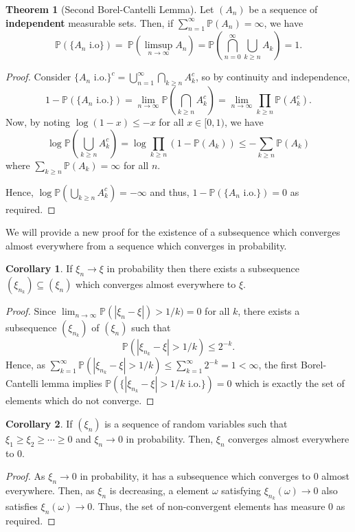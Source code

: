 \documentclass[]{article}
\theoremstyle{definition}
\newtheorem{theorem}{Theorem}
\newtheorem{corollary}{Corollary}[theorem]
\theoremstyle{definition}
\begin{document}
\begin{theorem}[Second Borel-Cantelli Lemma]
  Let \((A_n)\) be a sequence of \textbf{independent} measurable sets. Then, if 
  \(\sum_{n = 1}^\infty \mathbb{P}(A_n) = \infty\), we have 
  \[\mathbb{P}(\{A_n \text{ i.o}\}) = \
    \mathbb{P}\left(\limsup_{n \to \infty} A_n\right)
    = \mathbb{P}\left(\bigcap_{n = 0}^\infty \bigcup_{k \ge n} A_k\right) = 1.\]
\end{theorem}
\begin{proof}
  Consider \(\{A_n \text{ i.o.}\}^c = \bigcup_{n = 1}^\infty \bigcap_{k \ge n} A_k^c\),
  so by continuity and independence,
  \[1 - \mathbb{P}(\{A_n \text{ i.o.}\}) = 
    \lim_{n \to \infty}\mathbb{P}\left(\bigcap_{k \ge n}A_k^c\right)
    = \lim_{n \to \infty} \prod_{k \ge n} \mathbb{P}(A_k^c).\]
  Now, by noting \(\log(1 - x) \le -x\) for all \(x \in [0, 1)\), we have
  \[\log \mathbb{P}\left(\bigcup_{k \ge n} A_k^c\right) = 
    \log \prod_{k \ge n} (1 - \mathbb{P}(A_k))
    \le -\sum_{k \ge n} \mathbb{P}(A_k)\]
  where \(\sum_{k \ge n} \mathbb{P}(A_k) = \infty\) for all \(n\). 
  
  Hence, 
  \(\log \mathbb{P}\left(\bigcup_{k \ge n} A_k^c\right) = - \infty\) and thus, 
  \(1 - \mathbb{P}(\{A_n \text{ i.o.}\}) = 0\) as required.
\end{proof}

We will provide a new proof for the existence of a subsequence which converges 
almost everywhere from a sequence which converges in probability.

\begin{corollary}
  If \(\xi_n \to \xi\) in probability then there exists a subsequence 
  \((\xi_{n_k}) \subseteq (\xi_n)\) which converges almost everywhere to \(\xi\).
\end{corollary}
\begin{proof}
  Since \(\lim_{n \to \infty} \mathbb{P}(|\xi_n - \xi|) > 1 / k) = 0\) for all 
  \(k\), there exists a subsequence \((\xi_{n_k})\) of \((\xi_n)\) such that 
  \[\mathbb{P}(|\xi_{n_k} - \xi| > 1 / k) \le 2^{-k}.\]
  Hence, as \(\sum_{k = 1}^\infty \mathbb{P}(|\xi_{n_k} - \xi| > 1 / k) \le 
  \sum_{k = 1}^\infty 2^{-k} = 1 < \infty\), the first Borel-Cantelli lemma 
  implies \(\mathbb{P}(\{|\xi_{n_k} - \xi| > 1 / k \text{ i.o.}\}) = 0\)
  which is exactly the set of elements which do not converge.
\end{proof}

\begin{corollary}
  If \((\xi_n)\) is a sequence of random variables such that 
  \(\xi_1 \ge \xi_2 \ge \cdots \ge 0\) and \(\xi_n \to 0\) in probability. 
  Then, \(\xi_n\) converges almost everywhere to 0.
\end{corollary}
\begin{proof}
  As \(\xi_n \to 0\) in probability, it has a subsequence which converges to 0 
  almost everywhere. Then, as \(\xi_n\) is decreasing, a element \(\omega\) 
  satisfying \(\xi_{n_k}(\omega) \to 0\) also satisfies \(\xi_n(\omega) \to 0\).
  Thus, the set of non-convergent elements has measure 0 as required.
\end{proof}
\end{document}
